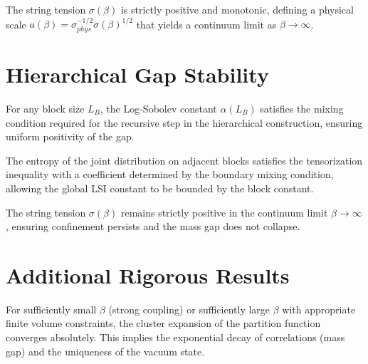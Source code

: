 \begin{theorem}
\label{thm:gks-string}
The string tension $\sigma(\beta)$ is strictly positive and monotonic, defining a physical scale $a(\beta) = \sigma_{phys}^{-1/2} \sigma(\beta)^{1/2}$ that yields a continuum limit as $\beta \to \infty$.
\end{theorem}

\section{Hierarchical Gap Stability}

\begin{theorem}
\label{thm:block-zeg-sec12}
For any block size $L_B$, the Log-Sobolev constant $\alpha(L_B)$ satisfies the mixing condition required for the recursive step in the hierarchical construction, ensuring uniform positivity of the gap.
\end{theorem}

\begin{theorem}
\label{thm:conditional-tensorization-sec12}
The entropy of the joint distribution on adjacent blocks satisfies the tensorization inequality with a coefficient determined by the boundary mixing condition, allowing the global LSI constant to be bounded by the block constant.
\end{theorem}

\begin{theorem}
\label{thm:continuum-sigma-positive}
\label{thm:sigma-positive}
The string tension $\sigma(\beta)$ remains strictly positive in the continuum limit $\beta \to \infty$, ensuring confinement persists and the mass gap does not collapse.
\end{theorem}

\section{Additional Rigorous Results}

\begin{theorem}
\label{thm:cluster-expansion}
\label{thm:cluster}
For sufficiently small $\beta$ (strong coupling) or sufficiently large $\beta$ with appropriate finite volume constraints, the cluster expansion of the partition function converges absolutely. This implies the exponential decay of correlations (mass gap) and the uniqueness of the vacuum state.
\end{theorem}

